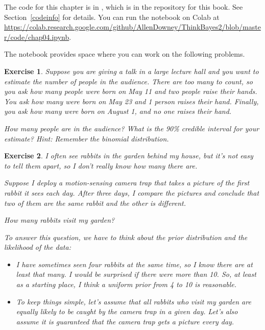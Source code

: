 \documentclass[12pt]{book}
\theoremstyle{exercise}
\newtheorem{exercise}{Exercise}[chapter]
\begin{document}
The code for this chapter is in , which is in the repository for this book.  See Section~\ref{codeinfo} for details.
You can run the notebook on Colab at \url{https://colab.research.google.com/github/AllenDowney/ThinkBayes2/blob/master/code/chap04.ipynb}.

The notebook provides space where you can work on the following problems.


\begin{exercise}
Suppose you are giving a talk in a large lecture hall and you want to estimate the number of people in the audience.  There are too many to count, so you ask how many people were born on May 11 and two people raise their hands.  You ask how many were born on May 23 and 1 person raises their hand.  Finally, you ask how many were born on August 1, and no one raises their hand.

How many people are in the audience?  What is the 90\% credible interval for your estimate?  Hint: Remember the binomial distribution.
\end{exercise}


\begin{exercise}
I often see rabbits in the garden behind my house, but it's not easy to tell them apart, so I don't really know how many there are.

Suppose I deploy a motion-sensing camera trap that takes a picture of the first rabbit it sees each day.  After three days, I compare the pictures and conclude that two of them are the same rabbit and the other is different.

How many rabbits visit my garden?

To answer this question, we have to think about the prior distribution and the likelihood of the data:

\begin{itemize}

\item I have sometimes seen four rabbits at the same time, so I know there are at least that many.  I would be surprised if there were more than 10.  So, at least as a starting place, I think a uniform prior from 4 to 10 is reasonable.

\item To keep things simple, let's assume that all rabbits who visit my garden are equally likely to be caught by the camera trap in a given day.  Let's also assume it is guaranteed that the camera trap gets a picture every day.

\end{itemize}

\end{exercise}
\end{document}
